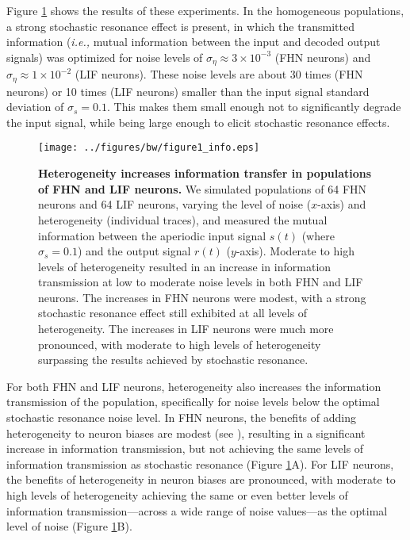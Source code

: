 \documentclass[12pt]{article}
\newcommand{\ie}{\emph{i.e., }}
\newcommand{\fig}[1]{Figure \ref{fig:#1}}
\newcommand{\figlabel}[1]{\label{fig:#1}}
\newcommand{\scn}[1]{\textsc{\nameref{scn:#1}}}
\begin{document}
\fig{info} shows the results of these experiments. In the homogeneous populations, a strong stochastic resonance effect is present, in which the transmitted information (\ie mutual information between the input and decoded output signals) was optimized for noise levels of $\sigma_\eta \approx 3 \times 10^{-3}$ (FHN neurons) and $\sigma_\eta \approx 1 \times 10^{-2}$ (LIF neurons). These noise levels are about 30 times (FHN neurons) or 10 times (LIF neurons) smaller than the input signal standard deviation of $\sigma_s = 0.1$. This makes them small enough not to significantly degrade the input signal, while being large enough to elicit stochastic resonance effects.

\begin{figure}
  \ifx\hidefigures\undefined
    \centering
    \texttt{[image: ../figures/bw/figure1\_info.eps]}
  \fi
  \caption{
    \textbf{Heterogeneity increases information transfer in populations of FHN and LIF neurons.} We simulated populations of 64 FHN neurons and 64 LIF neurons, varying the level of noise ($x$-axis) and heterogeneity (individual traces), and measured the mutual information between the aperiodic input signal $s(t)$ (where $\sigma_s = 0.1$) and the output signal $r(t)$ ($y$-axis). Moderate to high levels of heterogeneity resulted in an increase in information transmission at low to moderate noise levels in both FHN and LIF neurons. The increases in FHN neurons were modest, with a strong stochastic resonance effect still exhibited at all levels of heterogeneity. The increases in LIF neurons were much more pronounced, with moderate to high levels of heterogeneity surpassing the results achieved by stochastic resonance.
  }
  \figlabel{info}
\end{figure}

For both FHN and LIF neurons, heterogeneity also increases the information transmission of the population, specifically for noise levels below the optimal stochastic resonance noise level. In FHN neurons, the benefits of adding heterogeneity to neuron biases are modest (see \scn{phase}), resulting in a significant increase in information transmission, but not achieving the same levels of information transmission as stochastic resonance (\fig{info}A). For LIF neurons, the benefits of heterogeneity in neuron biases are pronounced, with moderate to high levels of heterogeneity achieving the same or even better levels of information transmission---across a wide range of noise values---as the optimal level of noise (\fig{info}B).
\end{document}
